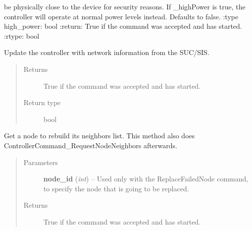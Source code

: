 \documentclass[letterpaper,10pt,english]{sphinxmanual}
\begin{document}
\begin{fulllineitems}
\begin{fulllineitems}
\begin{quote}
\begin{description}
\end{description}\end{quote}

be physically close to the device for security reasons.  If \_highPower is true, the controller will
operate at normal power levels instead.  Defaults to false.
:type high\_power: bool
:return: True if the command was accepted and has started.
:rtype: bool

\end{fulllineitems}


\begin{fulllineitems}
\label{controller:openzwave.controller.ZWaveController.begin_command_request_network_update}
Update the controller with network information from the SUC/SIS.
\begin{quote}\begin{description}
\item[{Returns}] \leavevmode
True if the command was accepted and has started.

\item[{Return type}] \leavevmode
bool

\end{description}\end{quote}

\end{fulllineitems}


\begin{fulllineitems}
\label{controller:openzwave.controller.ZWaveController.begin_command_request_node_neigbhor_update}
Get a node to rebuild its neighbors list.
This method also does ControllerCommand\_RequestNodeNeighbors afterwards.
\begin{quote}\begin{description}
\item[{Parameters}] \leavevmode
\textbf{node\_id} (\emph{int}) -- Used only with the ReplaceFailedNode command, to specify the node that is going to be replaced.

\item[{Returns}] \leavevmode
True if the command was accepted and has started.


\end{description}
\end{quote}
\end{fulllineitems}
\end{fulllineitems}
\end{document}
